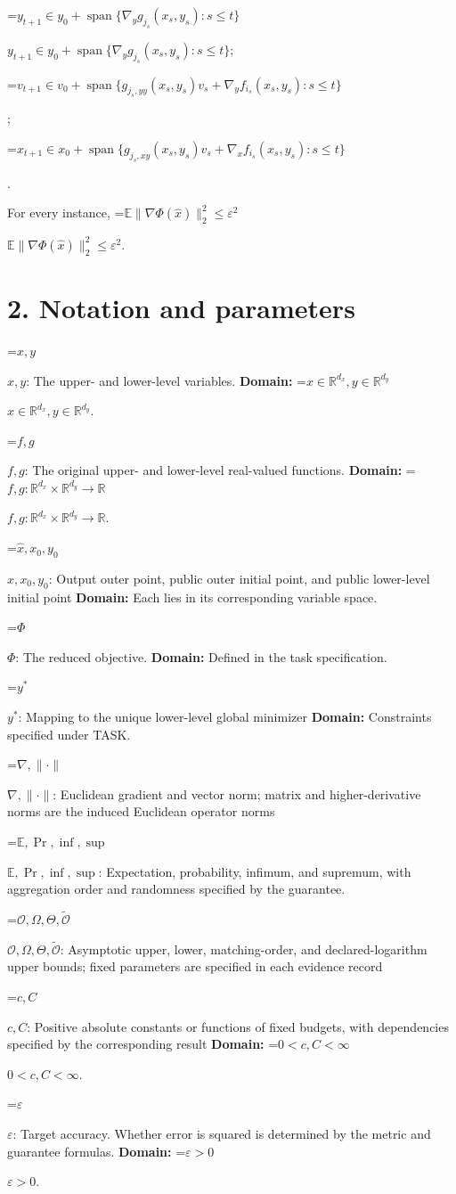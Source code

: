 \documentclass[10pt,a4paper]{article}
\newcommand{\AtlasMath}[1]{\par\begingroup\centering\setbox0=\hbox{$\displaystyle #1$}\ifdim\wd0>1.4\linewidth\typeout{ATLAS WIDE FORMULA: \the\wd0}\fi\ifdim\wd0>\linewidth\resizebox{\linewidth}{!}{\box0}\else\box0\fi\par\endgroup}
\newcommand{\AtlasInlineMath}[1]{\begingroup\setbox0=\hbox{$#1$}\ifdim\wd0>.4\linewidth\endgroup\AtlasMath{#1}\else\endgroup$#1$\fi}
\begin{document}
\AtlasInlineMath{y_{t+1}\in y_0+\operatorname{span}\{\nabla_yg_{j_s}(x_s,y_s):s\le t\}}; 
\AtlasMath{v_{t+1}\in v_0+\operatorname{span}\{g_{j_s,yy}(x_s,y_s)v_s+\nabla_yf_{i_s}(x_s,y_s):s\le t\}}
; 
\AtlasMath{x_{t+1}\in x_0+\operatorname{span}\{g_{j_s,xy}(x_s,y_s)v_s+\nabla_xf_{i_s}(x_s,y_s):s\le t\}}
.

For every instance, \AtlasInlineMath{\mathbb{E}\|\nabla\Phi(\widehat{x})\|_2^2\le\varepsilon^2}.

\section{2. Notation and parameters}
\AtlasInlineMath{x,y}: The upper- and lower-level variables. \textbf{Domain:} \AtlasInlineMath{x\in\mathbb R^{d_x},y\in\mathbb R^{d_y}}.

\AtlasInlineMath{f,g}: The original upper- and lower-level real-valued functions. \textbf{Domain:} \AtlasInlineMath{f,g:\mathbb R^{d_x}\times\mathbb R^{d_y}\to\mathbb R}.

\AtlasInlineMath{\widehat x,x_0,y_0}: Output outer point, public outer initial point, and public lower-level initial point \textbf{Domain:} Each lies in its corresponding variable space.

\AtlasInlineMath{\Phi}: The reduced objective. \textbf{Domain:} Defined in the task specification.

\AtlasInlineMath{y^*}: Mapping to the unique lower-level global minimizer \textbf{Domain:} Constraints specified under TASK.

\AtlasInlineMath{\nabla,\|\cdot\|}: Euclidean gradient and vector norm; matrix and higher-derivative norms are the induced Euclidean operator norms

\AtlasInlineMath{\mathbb E,\Pr,\inf,\sup}: Expectation, probability, infimum, and supremum, with aggregation order and randomness specified by the guarantee.

\AtlasInlineMath{\mathcal O,\Omega,\Theta,\widetilde{\mathcal O}}: Asymptotic upper, lower, matching-order, and declared-logarithm upper bounds; fixed parameters are specified in each evidence record

\AtlasInlineMath{c,C}: Positive absolute constants or functions of fixed budgets, with dependencies specified by the corresponding result \textbf{Domain:} \AtlasInlineMath{0<c,C<\infty}.

\AtlasInlineMath{\varepsilon}: Target accuracy. Whether error is squared is determined by the metric and guarantee formulas. \textbf{Domain:} \AtlasInlineMath{\varepsilon>0}.
\end{document}
